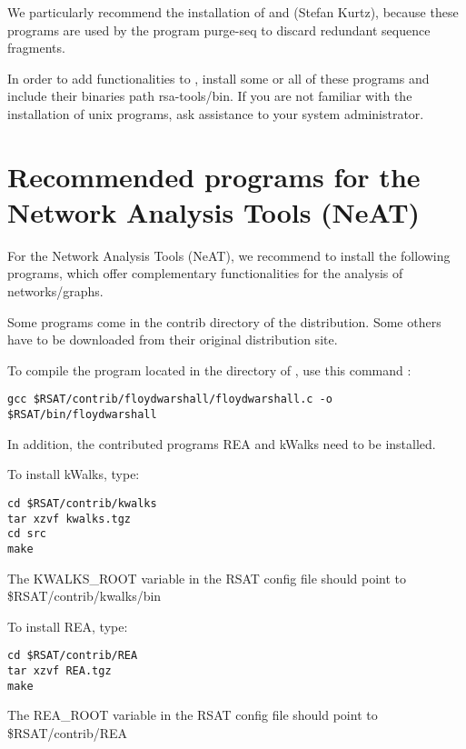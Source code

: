 \documentclass{book}
\begin{document}
We particularly recommend the installation of  and
 (Stefan Kurtz), because these programs are used by
the program purge-seq to discard redundant sequence fragments.

In order to add functionalities to \RSAT, install some or all of these
programs and include their binaries path rsa-tools/bin. If you are not
familiar with the installation of unix programs, ask assistance to
your system administrator.


\section{Recommended programs for the Network Analysis Tools (NeAT)}


For the Network Analysis Tools (NeAT), we recommend to install the
following programs, which offer complementary functionalities for the
analysis of networks/graphs.

Some programs come in the contrib directory of the \RSAT
distribution. Some others have to be downloaded from their original
distribution site.

To compile the program  located in the
 directory of \RSAT, use this command :

\begin{footnotesize}
\begin{verbatim}
gcc $RSAT/contrib/floydwarshall/floydwarshall.c -o $RSAT/bin/floydwarshall
\end{verbatim}
\end{footnotesize}


In addition, the contributed programs REA and kWalks need to be installed.

To install kWalks, type:

\begin{footnotesize}
\begin{verbatim}
cd $RSAT/contrib/kwalks
tar xzvf kwalks.tgz
cd src
make
\end{verbatim}
\end{footnotesize}


The KWALKS\_ROOT variable in the RSAT config file should point to
\$RSAT/contrib/kwalks/bin

To install REA, type:

\begin{footnotesize}
\begin{verbatim}
cd $RSAT/contrib/REA
tar xzvf REA.tgz
make
\end{verbatim}
\end{footnotesize}

The REA\_ROOT variable in the RSAT config file should point to
\$RSAT/contrib/REA






\end{document}
